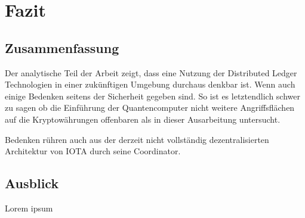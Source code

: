 \chapter{Fazit}
\section{Zusammenfassung}
Der analytische Teil der Arbeit zeigt, dass eine Nutzung der Distributed Ledger Technologien in einer zukünftigen Umgebung durchaus denkbar ist. Wenn auch einige Bedenken seitens der Sicherheit gegeben sind. So ist es letztendlich schwer zu sagen ob die Einführung der Quantencomputer nicht weitere Angriffsflächen auf die Kryptowährungen offenbaren als in dieser Ausarbeitung untersucht.

Bedenken rühren auch aus der derzeit nicht vollständig dezentralisierten Architektur von IOTA durch seine Coordinator.

\section{Ausblick}
Lorem ipsum